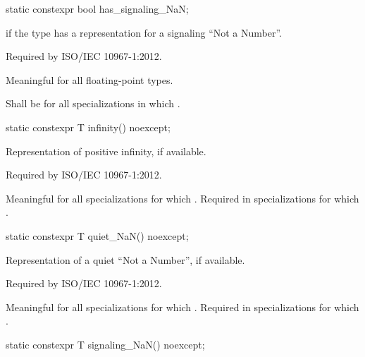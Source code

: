 %
\begin{itemdecl}
static constexpr bool has_signaling_NaN;
\end{itemdecl}

\begin{itemdescr}
\pnum
{} if the type has a representation for a signaling ``Not a Number''.
\begin{footnote}
Required by ISO/IEC 10967-1:2012.
\end{footnote}

\pnum
Meaningful for all floating-point types.

\pnum
Shall be
for all specializations in which
.
\end{itemdescr}

%
\begin{itemdecl}
static constexpr T infinity() noexcept;
\end{itemdecl}

\begin{itemdescr}
\pnum
Representation of positive infinity, if available.
\begin{footnote}
Required by ISO/IEC 10967-1:2012.
\end{footnote}

\pnum
Meaningful for all specializations for which
.
Required in specializations for which
.
\end{itemdescr}

%
\begin{itemdecl}
static constexpr T quiet_NaN() noexcept;
\end{itemdecl}

\begin{itemdescr}
\pnum
Representation of a quiet ``Not a Number'', if available.
\begin{footnote}
Required by ISO/IEC 10967-1:2012.
\end{footnote}

\pnum
Meaningful for all specializations for which
.
Required in specializations for which
.
\end{itemdescr}

%
\begin{itemdecl}
static constexpr T signaling_NaN() noexcept;
\end{itemdecl}

